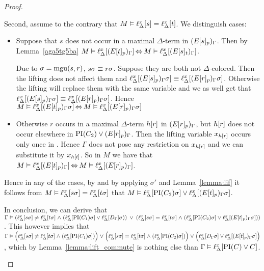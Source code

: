 \begin{proof}
\begin{description}
\begin{enumerate}
					Second, assume to the contrary that $M \vDash \ell_{\Delta}^{x}[s] = \ell_{\Delta}^{x}[t]$.
					We distinguish cases:
					\begin{itemize}
						\item
							Suppose that $s$ does not occur in a maximal $\Delta$-term in $(E{[s]_{p}})_\Gamma$.
							Then by Lemma~\ref{aga5tg5ba} $M\vDash \ell_{\Delta}^{x}[(E{[t]_{p}})_\Gamma] \operatorname{\Leftrightarrow} M \vDash \ell_{\Delta}^{x}[(E{[s]_{t}})_\Gamma]$.

							Due to $\sigma=\operatorname{mgu}(s, r)$, $s\sigma \equiv r\sigma$.
							Suppose they are both not $\Delta$-colored.
							Then the lifting does not affect them and 
							$\ell_{\Delta}^{x}[(E{[s]_{p}})_\Gamma\sigma] \equiv \ell_{\Delta}^{x}[(E{[r]_{p}})_\Gamma\sigma]$.
							Otherwise the lifting will replace them with the same variable and we as well get that
							$\ell_{\Delta}^{x}[(E{[s]_{p}})_\Gamma\sigma] \equiv \ell_{\Delta}^{x}[(E{[r]_{p}})_\Gamma\sigma]$.
							Hence $M\vDash \ell_{\Delta}^{x}[(E{[t]_{p}})_\Gamma\sigma] \operatorname{\Leftrightarrow}\allowbreak M\vDash 
							\ell_{\Delta}^{x}[(E{[r]_{p}})_\Gamma\sigma]$

						\item
							Otherwise $r$ occurs in a maximal $\Delta$-term $h[r]$ in $(E{[r]_{p}})_\Gamma$, but $h[r]$ does not occur elsewhere in $\operatorname{PI}(C_2) \lor (E{[r]_{p}})_\Gamma$.
							Then the lifting variable $x_{h[r]}$ occurs only once in \markB{}.
							Hence $\Gamma$ does not pose any restriction on $x_{h[r]}$ and we can substitute it by $x_{h[t]}$. 
							So in $M$ we have that $M\vDash \ell_{\Delta}^{x}[(E{[t]_{p}})_\Gamma] \operatorname{\Leftrightarrow}\allowbreak M\vDash \ell_{\Delta}^{x}[(E{[r]_{p}})_\Gamma]$.

					\end{itemize}

					Hence in any of the cases, by \markB{} and by applying $\sigma'$ and Lemma~\ref{lemma:lif}
					it follows from $M\vDash \ell_{\Delta}^{x}[s\sigma] = \ell_{\Delta}^{x}[t\sigma]$ 
					that $M \vDash \ell_{\Delta}^{x}[\operatorname{PI}(C_2)\sigma] \lor \ell_{\Delta}^{x}[(E{[t]_{p}})_\Gamma\sigma]$. 
					\medskip

					In conclusion, we can derive that 
					$\Gamma \vDash
					(\ell_{\Delta}^{x}[s\sigma] \neq \ell_{\Delta}^{x}[t\sigma] \;{\land}\;\allowbreak (\ell_{\Delta}^{x}[\operatorname{PI}(C_1)\sigma] \lor \ell_{\Delta}^{x}[D_\Gamma]\sigma))
					\;\,{\lor}\;\,\allowbreak
					(\ell_{\Delta}^{x}[s\sigma] = \ell_{\Delta}^{x}[t\sigma] \;{\land}\; (\ell_{\Delta}^{x}[\operatorname{PI}(C_2)\sigma] \lor \ell_{\Delta}^{x}[(E{[t]_{p}})_\Gamma\sigma]))$.
					This however implies that
					$\Gamma \entails
					\Big(\lifdelta{s\sigma} \neq \lifdelta{t\sigma} \spas\land (\lifdelta{\PI(C_1)\sigma} )\Big)
					\spas{\lor}\allowbreak
					\Big(\lifdelta{s\sigma} =\nolinebreak \lifdelta{t\sigma} \spas\land (\lifdelta{\PI(C_2)\sigma}) \Big)
					\spas\lor\allowbreak \Big(\lifdelta{D_\Gamma\sigma} \lor \lifdelta{(E\occat{t}{p})_\Gamma\sigma}\Big)$, 
					which by Lemma~\ref{lemma:lift_commute} is nothing else than
					$\Gamma \vDash \ell_{\Delta}^{x}[\operatorname{PI}(C) \lor C]$.


\end{enumerate}
\end{description}
\end{proof}
